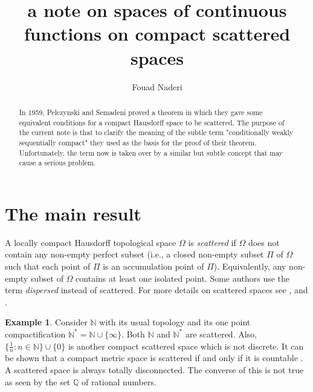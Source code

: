 \documentclass[11pt,bezier,epsf]{amsart}
\theoremstyle{definition}
\newtheorem{example}[thm]{Example}
\theoremstyle{remark}
\numberwithin{equation}{section}
\begin{document}
\title[a note on spaces of continuous functions]{a note on spaces of continuous
functions on compact scattered spaces}

\author[F. Naderi]{Fouad Naderi}

\address{Department of Mathematical and Statistical Sciences, University of
Alberta, Edmonton, Alberta, T6G 2G1, Canada.}



\begin{abstract}
In 1959, Pelczynski and Semadeni proved a theorem in which they gave some
equivalent conditions for a compact Hausdorff space to be scattered.
The purpose of the current note is that to clarify the meaning of the subtle term "conditionally weakly sequentially compact" they used as the basis for the proof of their
theorem. Unfortunately,  the term now is taken over by a similar but subtle concept that may cause a serious problem.
\end{abstract}

\maketitle

\section{The main result}

 A locally compact Hausdorff topological space $\varOmega$ is {\it scattered} if
 $\varOmega$ does not contain any non-empty perfect subset (i.e., a closed
 non-empty subset $\varPi$ of $\varOmega$ such that each point of $\varPi$ is an
 accumulation point of $\varPi$). Equivalently, any non-empty subset of
 $\varOmega$ contains at least one isolated point. Some authors use the term
 {\it dispersed} instead of scattered. For more details on scattered spaces see
 \cite{Mont}, \cite{Semadeni} and \cite{Semadeni_book}.

\begin{example} \label{infinity}
Consider $\mathbb{N}$ with its usual topology and its one point compactification
${\mathbb{N}}^{*}=\mathbb{N} \cup \{\infty\}$. Both $\mathbb{N}$ and
${\mathbb{N}}^{*}$ are scattered. Also, $\{\frac{1}{n}: n\in \mathbb{N} \}\cup \{0\} $
is another compact scattered space which is not discrete. It can be
shown that a compact metric space is scattered if and only if it is countable
\cite[p.737]{Mont}. A scattered 
space is always totally disconnected. The converse of this is not true as seen by the set $\mathbb{Q}$ of rational numbers.
\end{example}
\end{document}

